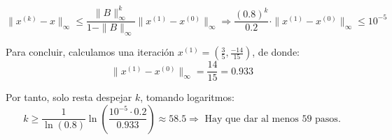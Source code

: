 \documentclass[12pt]{article}
\begin{document}
\begin{ejercicio}[3 puntos]
\begin{enumerate}[label=\alph*)]
				$$
				\|x^{(k)} - x\|_{\infty} \leq \frac{\|B\|_{\infty}^k}{1 - \|B\|_{\infty}} \|x^{(1)} - x^{(0)}\|_{\infty} \Rightarrow
				\frac{(0.8)^k}{0.2} \cdot \|x^{(1)} - x^{(0)}\|_{\infty} \leq 10^{-5}
				$$
				
				Para concluir, calculamos una iteración $\displaystyle x^{(1)} = \left( \frac{3}{5}, \frac{-14}{15} \right)$, de donde: $$\displaystyle \|x^{(1)} - x^{(0)}\|_{\infty} = \frac{14}{15} = 0.933$$
				
				Por tanto, solo resta despejar $k$, tomando logaritmos:
				$$k \geq \frac{1}{\ln(0.8)} \ln\left( \frac{10^{-5} \cdot 0.2}{0.933} \right) \approx 58.5 \Rightarrow \text{ Hay que dar al menos 59 pasos.}
				$$
				
			
		\end{enumerate}
	\end{ejercicio}
\end{document}
